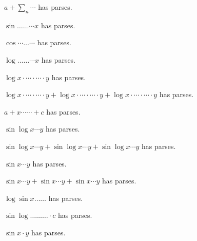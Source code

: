 \documentclass{article}
\makeatletter
\newcommand{\countparses}{\ltx@count@parses}
\makeatother
\begin{document}
$a+\sum_n\cdots$ has \countparses{} parses.

$\sin\ldots\ldots\cdots x$ has \countparses{} parses.

$\cos\cdots\ldots\cdots$ has \countparses{} parses.

$\log\ldots\ldots\cdots x$ has \countparses{} parses.

$\log x\cdot\cdots\cdot\cdots\cdot y$ has \countparses{} parses.

$\log x\cdot\cdots\cdot\cdots\cdot y+\log x\cdot\cdots\cdot\cdots\cdot y+\log x\cdot\cdots\cdot\cdots\cdot y$ has \countparses{} parses.

$a+x\cdots\cdots+c$ has \countparses{} parses.

$\sin\log x\cdots y$ has \countparses{} parses.

$\sin\log x\cdots y+\sin\log x\cdots y+\sin\log x\cdots y$ has \countparses{} parses.

$\sin x\cdots y$ has \countparses{} parses.

$\sin x\cdots y+\sin x\cdots y+\sin x\cdots y$ has \countparses{} parses.

$\log\sin x\ldots\ldots$ has \countparses{} parses.

$\sin\log\ldots\ldots\ldots\cdot c$ has \countparses{} parses.

$\sin x\cdot y$ has \countparses{} parses.
\end{document}
